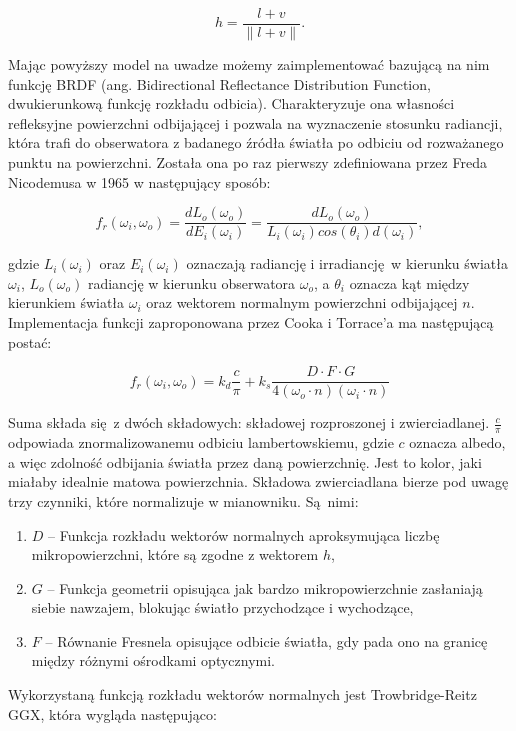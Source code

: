 $$
	h= \frac{l + v}{\|l + v\|}.
$$

	
Mając powyższy model na uwadze możemy zaimplementować bazującą na nim funkcję BRDF (ang. Bidirectional Reflectance Distribution Function, dwukierunkową funkcję rozkładu odbicia). Charakteryzuje ona własności refleksyjne powierzchni odbijającej i pozwala na wyznaczenie stosunku radiancji, która trafi do obserwatora z badanego źródła światła po odbiciu od rozważanego punktu na powierzchni. Została ona po raz pierwszy zdefiniowana przez Freda Nicodemusa w 1965 \cite{Nicodemus} w następujący sposób:

$$
	f_r(\omega_i, \omega_o) = \frac{dL_o(\omega_o)}{dE_i(\omega_i)} = \frac{dL_o(\omega_o)}{L_i(\omega_i) cos(\theta_i) d(\omega_i)},
$$

gdzie $L_i(\omega_i)$ oraz $E_i(\omega_i)$ oznaczają radiancję i irradiancję w kierunku światła $\omega_i$, $L_o(\omega_o)$ radiancję w kierunku obserwatora $\omega_o$, a $\theta_i$ oznacza kąt między kierunkiem światła $\omega_i$ oraz wektorem normalnym powierzchni odbijającej $n$. 
\\ 

Implementacja funkcji zaproponowana przez Cooka i Torrace'a ma następującą postać:

$$
f_r(\omega_i, \omega_o) = k_d \frac{c}{\pi} + k_s\frac{D \cdot F \cdot G}{4\left(\omega_o \cdot n \right) \left( \omega_i \cdot n \right)}
$$

Suma składa się z dwóch składowych: składowej rozproszonej i zwierciadlanej. $\frac{c}{\pi}$ odpowiada znormalizowanemu odbiciu lambertowskiemu, gdzie $c$ oznacza albedo, a więc zdolność odbijania światła przez daną powierzchnię. Jest to kolor, jaki miałaby idealnie matowa powierzchnia. Składowa zwierciadlana bierze pod uwagę trzy czynniki, które normalizuje w mianowniku. Są nimi:
\begin{enumerate}
	\item $D$ -- Funkcja rozkładu wektorów normalnych aproksymująca liczbę mikropowierzchni, które są zgodne z wektorem $h$,
	\item $G$ -- Funkcja geometrii opisująca jak bardzo mikropowierzchnie zasłaniają siebie nawzajem, blokując światło przychodzące i wychodzące,
	\item $F$ -- Równanie Fresnela opisujące odbicie światła, gdy pada ono na granicę między różnymi ośrodkami optycznymi.
\end{enumerate}

Wykorzystaną funkcją rozkładu wektorów normalnych jest Trowbridge-Reitz GGX, która wygląda następująco:

